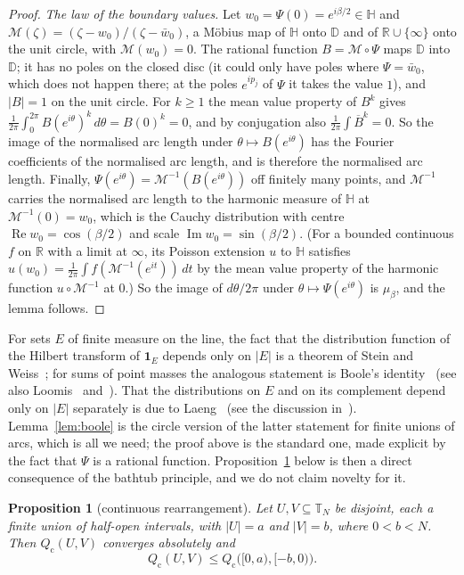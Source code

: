 \documentclass[11pt]{amsart}
\newtheorem{proposition}[theorem]{Proposition}
\theoremstyle{definition}
\theoremstyle{remark}
\newcommand{\R}{\mathbb{R}}
\newcommand{\T}{\mathbb{T}}
\newcommand{\D}{\mathbb{D}}
\newcommand{\HH}{\mathbb{H}}
\renewcommand{\Re}{\operatorname{Re}}
\renewcommand{\Im}{\operatorname{Im}}
\newcommand{\Qc}{Q_{\mathrm{c}}}
\newcommand{\one}{\mathbf{1}}
\begin{document}
\begin{proof}
\emph{The law of the boundary values.} Let $w_0=\Psi(0)=e^{i\beta/2}\in\HH$ and
$\mathcal M(\zeta)=(\zeta-w_0)/(\zeta-\bar w_0)$, a M\"obius map of $\HH$ onto $\D$ and of $\R\cup\{\infty\}$
onto the unit circle, with $\mathcal M(w_0)=0$. The rational function $B=\mathcal M\circ\Psi$ maps $\D$ into $\D$;
it has no poles on the closed disc (it could only have poles where $\Psi=\bar w_0$, which does not happen there;
at the poles $e^{ip_j}$ of $\Psi$ it takes the value $1$), and $|B|=1$ on the unit circle. For $k\ge1$ the mean
value property of $B^k$ gives $\frac1{2\pi}\int_0^{2\pi}B(e^{i\theta})^k\,d\theta=B(0)^k=0$, and by conjugation also
$\frac1{2\pi}\int\overline{B}^k=0$. So the image of the normalised arc length under $\theta\mapsto B(e^{i\theta})$ has
the Fourier coefficients of the normalised arc length, and is therefore the normalised arc length. Finally,
$\Psi(e^{i\theta})=\mathcal M^{-1}(B(e^{i\theta}))$ off finitely many points, and $\mathcal M^{-1}$ carries the
normalised arc length to the harmonic measure of $\HH$ at $\mathcal M^{-1}(0)=w_0$, which is the Cauchy distribution
with centre $\Re w_0=\cos(\beta/2)$ and scale $\Im w_0=\sin(\beta/2)$. (For a bounded continuous $f$ on $\R$ with a
limit at $\infty$, its Poisson extension $u$ to $\HH$ satisfies $u(w_0)=\frac1{2\pi}\int f(\mathcal M^{-1}(e^{it}))\,dt$ by
the mean value property of the harmonic function $u\circ\mathcal M^{-1}$ at $0$.) So the image of $d\theta/2\pi$ under
$\theta\mapsto\Psi(e^{i\theta})$ is $\mu_\beta$, and the lemma follows.
\end{proof}

For sets $E$ of finite measure on the line, the fact that the distribution function of the Hilbert transform of
$\one_E$ depends only on $|E|$ is a theorem of Stein and Weiss~\cite{SW}; for sums of point masses the analogous
statement is Boole's identity~\cite{Boole} (see also Loomis~\cite{Loomis} and~\cite{CLM}). That the distributions
on $E$ and on its complement depend only on $|E|$ separately is due to Laeng~\cite{Laeng} (see the discussion
in~\cite[Section~4]{GL}). Lemma~\ref{lem:boole} is the circle version of the latter statement for finite unions of
arcs, which is all we need; the proof above is the standard one, made explicit by the fact that $\Psi$ is a
rational function. Proposition~\ref{prop:cont} below is then a direct consequence of the bathtub principle, and
we do not claim novelty for it.

\begin{proposition}[continuous rearrangement]\label{prop:cont}
Let $U,V\subseteq\T_N$ be disjoint, each a finite union of half-open intervals, with $|U|=a$ and $|V|=b$, where
$0<b<N$. Then $\Qc(U,V)$ converges absolutely and
\[
\Qc(U,V)\le\Qc\bigl([0,a),[-b,0)\bigr).
\]
\end{proposition}
\end{document}
